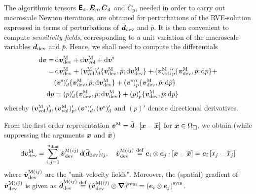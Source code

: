 \documentclass[10pt,a4paper]{article}
\newcommand{\NDIM}{n_\mathrm{dim}}
\newcommand{\ded}{\mathrm{d}}
\newcommand{\dep}{\mathrm{p}}
\begin{document}
The algorithmic tensors $\bar{\tf{E}}_\ded, \bar{\ts E }_\dep, \bar{\ts C}_\ded$ and $\bar{C}_\dep$, needed in order to carry out macroscale Newton iterations, are obtained for
perturbations of the RVE-solution expressed in terms of perturbations of $\bar{\boldsymbol{d}}_{\mathrm{dev}}$ and $\bar{p}$. It is then convenient to compute \emph{sensitivity fields}, corresponding to a unit variation of the macroscale variables $\bar{\boldsymbol{d}}_{\mathrm{dev}}$ and $\bar{p}$. Hence, we shall need to compute the differentials
\begin{align}
    \dif\ta{v}
     = &
    \dif\ta{v}^\macro_\dev + \dif\ta{v}^\macro_\vol + \dif\ta{v}^\fluct
\nonumber \\
     = &
    \dif\ta{v}^\macro_\dev + (\ta{v}^\macro_\vol)'_d \{\ta{v}^\macro_\dev,\bar{p};\dif\ta{v}^\macro_\dev\} + (\ta{v}^\macro_\vol)'_p \{\ta{v}^\macro_\dev,\bar{p};\dif\bar{p}\} +
\nonumber\\
    &
    (\ta{v}^\fluct)'_d\{\ta{v}^\macro_\dev,\bar{p};\dif\ta{v}^\macro_\dev\} + (\ta{v}^\fluct)'_p\{\ta{v}^\macro_\dev,\bar{p};\dif\bar{p}\}
\label{eq215a}
\\
    \dif p
    & = 
    (p)'_d\{\ta{v}^\macro_\dev,\bar{p};\dif\ta{v}^\macro_\dev\} + (p)'_p\{\ta{v}^\macro_\dev,\bar{p};\dif\bar{p}\}
\label{eq215b}
\end{align}
whereby $(\boldsymbol{v}^{\mathrm{M}}_{\mathrm{vol}})'_d, (\boldsymbol{v}^{\mathrm{M}}_{\mathrm{vol}})'_p, (\boldsymbol{v}^{\mathrm{s}})'_d, (\boldsymbol{v}^{\mathrm{s}})'_d$ and $(p)'$ denote directional derivatives.

From the first order representation $\boldsymbol{v}^{\mathrm{M}} = \bar{\boldsymbol{d}}\cdot[\boldsymbol{x}-\bar{\boldsymbol{x}}]$ for $\boldsymbol{x}\in\Omega_\Box$, we obtain (while suppressing the arguments $\boldsymbol{x}$ and $\bar{\boldsymbol{x}}$)
\begin{equation}
    \dif \ta{v}^\macro_\dev =
    \sum_{i,j=1}^{\NDIM} \hat{\ta{v}}^{\macro(ij)}_\dev \dif(\bar{\ts d}_\dev)_{ij}, \quad
    \hat{\ta{v}}^{\macro(ij)}_\dev \defeq \bee ij \cdot [\ta x -\bar{\ta x}] =
    \be i \left[x_j-\bar{x}_j\right]
    \label{eq216}
\end{equation}
where $\hat{\boldsymbol{v}}^{\mathrm{M}(ij)}_{\mathrm{dev}}$ are the "unit velocity fields". Moreover, the (spatial) gradient of $\hat{\boldsymbol{v}}^{\mathrm{M}(ij)}_{\mathrm{dev}}$ is given as $\hat{\boldsymbol{d}}^{\mathrm{M}(ij)}_{\mathrm{dev}}\overset{\mathrm{def}}{=}(\hat{\boldsymbol{v}}^{\mathrm{M}(ij)}_{\mathrm{dev}}\mathbin{\otimes}\boldsymbol{\nabla})^{\mathrm{sym}}=\left(\boldsymbol{e}_{i}\otimes\boldsymbol{e}_{j}\right)^{\mathrm{sym}}$.
\end{document}
